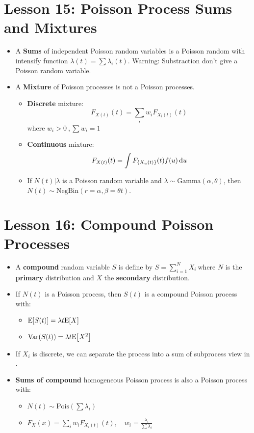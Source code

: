 \documentclass[10pt, french]{article}
\begin{document}
\begin{multicols*}{3}
\section*{Lesson 15: Poisson Process Sums and Mixtures}
\begin{itemize}[align=left,leftmargin=*]
    \item A \textbf{Sums} of independent Poisson random variables is a Poisson random with intensify function $\lambda(t)=\sum \lambda_i(t)$. {\color{red}Warning: Substraction don't give a Poisson random variable.}
    \item A \textbf{Mixture} of Poisson processes is not a Poisson processes.
    \begin{itemize}
        \item \textbf{Discrete} mixture: \[ F_{X(t)}(t) = \sum_i w_i F_{X_i(t)}(t) \] where $w_i>0\:,\sum w_i = 1$
        \item \textbf{Continuous} mixture: \[ F_{X(t)}(t) = \int F_{\{X_u(t)\}}(t) f(u) \mathop{}\!\mathrm{d}{u} \]
        \item If $N(t)|\lambda$ is a Poisson random variable and $\lambda \sim \mathrm{Gamma}(\alpha, \theta)$, then $N(t) \sim \mathrm{NegBin}(r = \alpha, \beta = \theta t)$.
    \end{itemize}
\end{itemize}

\section*{Lesson 16: Compound Poisson Processes}
\begin{itemize}[align=left,leftmargin=*]
    \item A \textbf{compound} random variable $S$ is define by $S = \sum_{i=1}^N X_i\:$where $N$ is the \textbf{primary} distribution and $X$ the \textbf{secondary} distribution.
    \item If $N(t)$ is a Poisson process, then $S(t)$ is a compound Poisson process with:
    \begin{itemize}
        \item $\mathrm{E} {\left[ S(t) \right]} =  \lambda t \mathrm{E} {\left[ X \right]}$
        \item $\mathrm{Var} {\left( S(t) \right)} = \lambda t \mathrm{E} {\left[ X^2 \right]}$
    \end{itemize}
    \item If $X_i$ is discrete, we can separate the process into a sum of subprocess view in {\color{brown!80!white}}.
    \item \textbf{Sums of compound} homogeneous Poisson process is also a Poisson process with:
    \begin{itemize}
        \item $N(t)\sim\textrm{Pois}(\sum \lambda_i)$
        \item $F_X(x)=\sum_i w_i F_{X_i(t)}(t),\quad w_i = \frac{\lambda_i}{\sum \lambda_i}$
    \end{itemize}
\end{itemize}


\end{multicols*}
\end{document}

